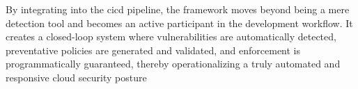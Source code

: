 By integrating into the \gls{cicd} pipeline, the framework moves beyond being a mere detection tool and becomes an active participant in the development workflow. It creates a closed-loop system where vulnerabilities are automatically detected, preventative policies are generated and validated, and enforcement is programmatically guaranteed, thereby operationalizing a truly automated and responsive cloud security posture  \cite{noauthor_streamlining_nodate}